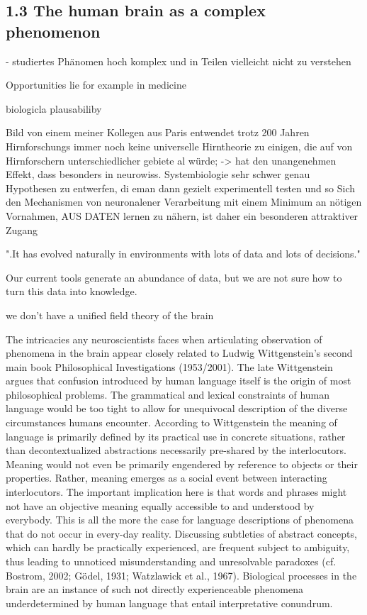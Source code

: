 \documentclass[authoryear,review,3p]{elsarticle}
\begin{document}
\subsection*{1.3 The human brain as a complex phenomenon}

- studiertes Phänomen hoch komplex und in Teilen vielleicht nicht zu verstehen

Opportunities lie for example in medicine

biologicla plausabiliby

Bild von einem meiner Kollegen aus Paris entwendet
trotz 200 Jahren Hirnforschungs immer noch keine universelle Hirntheorie zu einigen, die auf von Hirnforschern unterschiedlicher gebiete al würde;
-> hat den unangenehmen Effekt, dass besonders in neurowiss. Systembiologie sehr schwer genau Hypothesen zu entwerfen, di eman dann gezielt experimentell testen und so
Sich den Mechanismen von neuronalener Verarbeitung mit einem Minimum an nötigen Vornahmen, AUS DATEN lernen zu nähern, ist daher ein besonderen attraktiver Zugang

".It has evolved naturally in environments with lots of data and lots of decisions."

Our current tools generate an abundance of data, but we are not sure how to turn this data into knowledge.

we don’t have a unified field theory of the brain


The intricacies any neuroscientists faces when articulating observation of phenomena in the brain appear closely related to Ludwig Wittgenstein's second main book Philosophical Investigations (1953/2001). The late Wittgenstein argues that confusion introduced by human language itself is the origin of most philosophical problems. The grammatical and lexical constraints of human language would be too tight to allow for unequivocal description of the diverse circumstances humans encounter. According to Wittgenstein the meaning of language is primarily defined by its practical use in concrete situations, rather than decontextualized abstractions necessarily pre-shared by the interlocutors. Meaning would not even be primarily engendered by reference to objects or their properties. Rather, meaning emerges as a social event between interacting interlocutors. The important implication here is that words and phrases might not have an objective meaning equally accessible to and understood by everybody. This is all the more the case for language descriptions of phenomena that do not occur in every-day reality. Discussing subtleties of abstract concepts, which can hardly be practically experienced, are frequent subject to ambiguity, thus leading to unnoticed misunderstanding and unresolvable paradoxes (cf. Bostrom, 2002; Gödel, 1931; Watzlawick et al., 1967). Biological processes in the brain are an instance of such not directly experienceable phenomena underdetermined by human language that entail interpretative conundrum.
\end{document}
